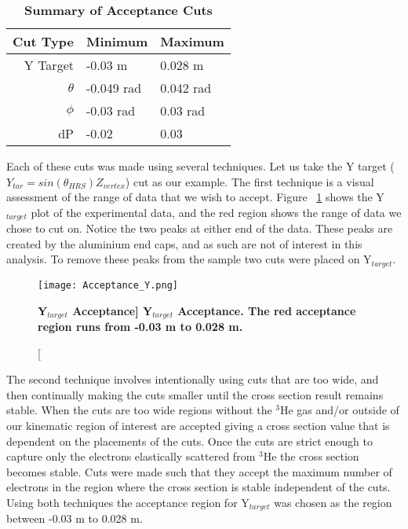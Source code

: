 \vspace{5mm}

\begin{table}[!h]
\centering
\begin{tabular}{|r | l l|}
\hline
\textbf{Cut Type} & \textbf{Minimum} & \textbf{Maximum}\\
\hline
Y Target & -0.03 m & 0.028 m\\ 
$\theta$ & -0.049 rad & 0.042 rad\\ 
$\phi$ & -0.03 rad & 0.03 rad\\ 
dP & -0.02 & 0.03\\ 
\hline
\end{tabular}
\caption{{\bf{Summary of Acceptance Cuts}} }
\label{tab:cuts}
\end{table}

Each of these cuts was made using several techniques. Let us take the Y target ($Y_{tar}=sin\left(\theta_{HRS}\right)Z_{vertex}$) cut as our example. The first technique is a visual assessment of the range of data that we wish to accept. Figure ~\ref{fig:acceptance_y} shows the Y$_{target}$ plot of the experimental data, and the red region shows the range of data we chose to cut on. Notice the two peaks at either end of the data. These peaks are created by the aluminium end caps, and as such are not of interest in this analysis. To remove these peaks from the sample two cuts were placed on Y$_{target}$. 

\begin{figure}[!ht]
\begin{center}
\texttt{[image: Acceptance\_Y.png]}
\end{center}
\caption[\bf{Y$_{target}$ Acceptance}]{
{\bf{Y$_{target}$ Acceptance.}} The red acceptance region runs from -0.03 m to 0.028 m.}
\label{fig:acceptance_y}
\end{figure}

The second technique involves intentionally using cuts that are too wide, and then continually making the cuts smaller until the cross section result remains stable. When the cuts are too wide regions without the $^3$He gas and/or outside of our kinematic region of interest are accepted giving a cross section value that is dependent on the placements of the cuts. Once the cuts are strict enough to capture only the electrons elastically scattered from $^3$He the cross section becomes stable. Cuts were made such that they accept the maximum number of electrons in the region where the cross section is stable independent of the cuts. Using both techniques the acceptance region for Y$_{target}$ was chosen as the region between -0.03 m to 0.028 m.

